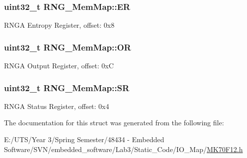 \subsubsection[{E\+R}]{\setlength{\rightskip}{0pt plus 5cm}uint32\+\_\+t R\+N\+G\+\_\+\+Mem\+Map\+::\+E\+R}\label{struct_r_n_g___mem_map_a00c023d8dafb81ac55c86b3ad8decb3d}
R\+N\+G\+A Entropy Register, offset\+: 0x8 \hypertarget{struct_r_n_g___mem_map_a28a39f4167d28546cea918687d2951f1}{}
\subsubsection[{O\+R}]{\setlength{\rightskip}{0pt plus 5cm}uint32\+\_\+t R\+N\+G\+\_\+\+Mem\+Map\+::\+O\+R}\label{struct_r_n_g___mem_map_a28a39f4167d28546cea918687d2951f1}
R\+N\+G\+A Output Register, offset\+: 0x\+C \hypertarget{struct_r_n_g___mem_map_a5d258b2ed1915070a6d3651092d8f3c7}{}
\subsubsection[{S\+R}]{\setlength{\rightskip}{0pt plus 5cm}uint32\+\_\+t R\+N\+G\+\_\+\+Mem\+Map\+::\+S\+R}\label{struct_r_n_g___mem_map_a5d258b2ed1915070a6d3651092d8f3c7}
R\+N\+G\+A Status Register, offset\+: 0x4 

The documentation for this struct was generated from the following file\+:\begin{DoxyCompactItemize}
\item 
E\+:/\+U\+T\+S/\+Year 3/\+Spring Semester/48434 -\/ Embedded Software/\+S\+V\+N/embedded\+\_\+software/\+Lab3/\+Static\+\_\+\+Code/\+I\+O\+\_\+\+Map/\hyperlink{_m_k70_f12_8h}{M\+K70\+F12.\+h}\end{DoxyCompactItemize}
